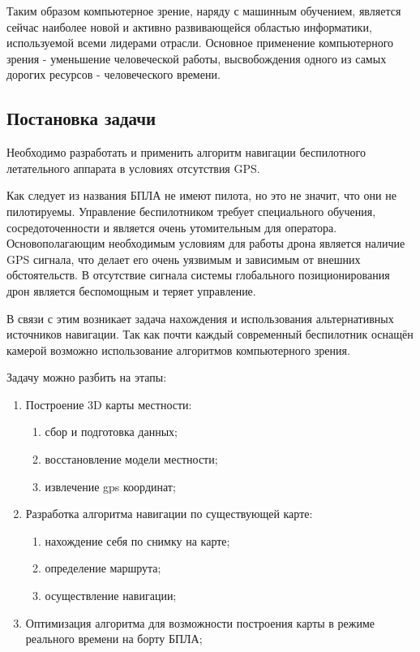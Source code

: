     \vspace{1em}
    
    Таким образом компьютерное зрение, наряду с машинным обучением, является сейчас наиболее новой и активно развивающейся областью информатики, используемой всеми лидерами отрасли. Основное применение компьютерного зрения - уменьшение человеческой работы, высвобождения одного из самых дорогих ресурсов - человеческого времени.
    
    \subsection*{Постановка задачи}
    
    \tab Необходимо разработать и применить алгоритм навигации беспилотного летательного аппарата в условиях отсутствия GPS.
    
    Как следует из названия БПЛА не имеют пилота, но это не значит, что они не пилотируемы. Управление беспилотником требует специального обучения, сосредоточенности и является очень утомительным для оператора. Основополагающим необходимым условиям для работы дрона является наличие GPS сигнала, что делает его очень уязвимым и зависимым от внешних обстоятельств. В отсутствие сигнала системы глобального позиционирования дрон является беспомощным и теряет управление.
    
    \vspace{1em}
    
     В связи с этим возникает задача нахождения и использования альтернативных источников навигации. Так как почти каждый современный беспилотник оснащён камерой возможно использование алгоритмов компьютерного зрения.
     
     \vspace{1em}
     
     Задачу можно разбить на этапы:
     \begin{enumerate}
         \item Построение 3D карты местности:
         \begin{enumerate}
            \item сбор и подготовка данных;
            \item восстановление модели местности;
            \item извлечение gps координат;
         \end{enumerate}
         \item Разработка алгоритма навигации по существующей карте:
         \begin{enumerate}
            \item нахождение себя по снимку на карте;
            \item определение маршрута;
            \item осуществление навигации;
         \end{enumerate}
         \item Оптимизация алгоритма для возможности построения карты в режиме реального времени на борту БПЛА;
     \end{enumerate}
    
